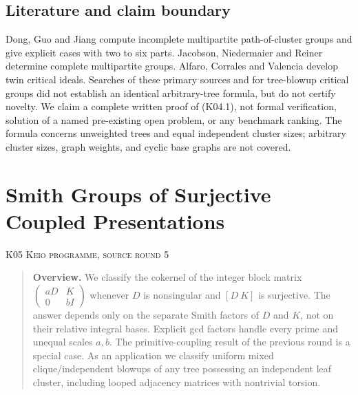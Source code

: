 \documentclass[11pt,a4paper]{article}
\theoremstyle{definition}\newtheorem{definition}[theorem]{Definition}
\theoremstyle{remark}\newtheorem{remark}[theorem]{Remark}
\numberwithin{equation}{section}
\begin{document}
\subsection{Literature and claim boundary}\label{K04-sec-7}
Dong, Guo and Jiang \cite{ref028} compute incomplete multipartite path-of-cluster groups and give explicit cases with two to six parts. Jacobson, Niedermaier and Reiner \cite{ref032} determine complete multipartite groups. Alfaro, Corrales and Valencia \cite{ref029} develop twin critical ideals. Searches of these primary sources and for tree-blowup critical groups did not establish an identical arbitrary-tree formula, but do not certify novelty. We claim a complete written proof of (K04.1), not formal verification, solution of a named pre-existing open problem, or any benchmark ranking. The formula concerns unweighted trees and equal independent cluster sizes; arbitrary cluster sizes, graph weights, and cyclic base graphs are not covered.




\clearpage
\section[K05 --- Smith Groups of Surjective Coupled Presentations]{Smith Groups of Surjective Coupled Presentations}\label{contrib-K05}
\noindent\textsc{K05 \quad Keio programme, source round 5}\par\medskip


\begin{quote}\small\textbf{Overview.} We classify the cokernel of the integer block matrix $\left(\begin{smallmatrix}aD&K\\0&bI\end{smallmatrix}\right)$ whenever $D$ is nonsingular and $[D\ K]$ is surjective. The answer depends only on the separate Smith factors of $D$ and $K$, not on their relative integral bases. Explicit gcd factors handle every prime and unequal scales $a,b$. The primitive-coupling result of the previous round is a special case. As an application we classify uniform mixed clique/independent blowups of any tree possessing an independent leaf cluster, including looped adjacency matrices with nontrivial torsion.\end{quote}
\end{document}
